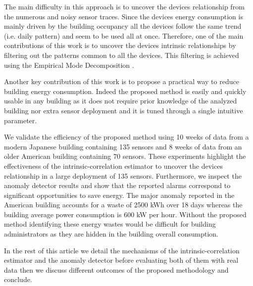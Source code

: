 The main difficulty in this approach is to uncover the devices relationship from the numerous and noisy sensor traces. 
Since the devices energy consumption is mainly driven by the building occupancy all the devices follow the same trend (i.e. daily pattern) and seem to be used all at once.
Therefore, one of the main contributions of this work is to uncover the devices intrinsic relationships by filtering out the patterns common to all the devices.
This filtering is achieved using the Empirical Mode Decomposition \cite{huang:emd1998}.

Another key contribution of this work is to propose a practical way to reduce building energy consumption.
Indeed the proposed method is easily and quickly usable in any building as it does not require prior knowledge of the analyzed building nor extra sensor deployment and it is tuned through a single intuitive parameter.

We validate the efficiency of the proposed method using 10 weeks of data from a modern Japanese building containing 135 sensors and 8 weeks of data from an older American building containing 70 sensors.
These experiments highlight the effectiveness of the intrinsic-correlation estimator to uncover the devices relationship in a large deployment of 135 sensors.
Furthermore, we inspect the anomaly detector results and show that the reported alarms correspond to significant opportunities to save energy.
The major anomaly reported in the American building accounts for a waste of 2500 kWh over 18 days whereas the building average power consumption is 600 kW per hour.
Without the proposed method identifying these energy wastes would be difficult for building administrators as they are hidden in the building overall consumption.

In the rest of this article we detail the mechanisms of the intrinsic-correlation estimator and the anomaly detector before evaluating both of them with real data then we discuss different outcomes of the proposed methodology and conclude.
